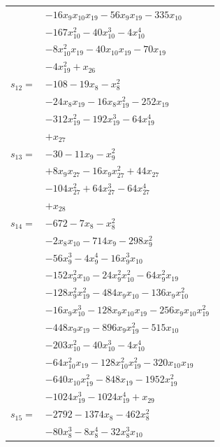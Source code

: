 \begin{longtable}{@{}r@{\;}l@{}}
 & \(\displaystyle -16x_{9}x_{10}x_{19} -56x_{9}x_{19} -335x_{10}\) \\
 & \(\displaystyle -167x_{10}^{2} -40x_{10}^{3} -4x_{10}^{4}\) \\
 & \(\displaystyle -8x_{10}^{2}x_{19} -40x_{10}x_{19} -70x_{19}\) \\
 & \(\displaystyle -4x_{19}^{2} +x_{26}\) \\[3pt]
\(s_{12}=\) & \(\displaystyle -108 -19x_{8} -x_{8}^{2}\) \\
 & \(\displaystyle -24x_{8}x_{19} -16x_{8}x_{19}^{2} -252x_{19}\) \\
 & \(\displaystyle -312x_{19}^{2} -192x_{19}^{3} -64x_{19}^{4}\) \\
 & \(\displaystyle +x_{27}\) \\[3pt]
\(s_{13}=\) & \(\displaystyle -30 -11x_{9} -x_{9}^{2}\) \\
 & \(\displaystyle +8x_{9}x_{27} -16x_{9}x_{27}^{2} +44x_{27}\) \\
 & \(\displaystyle -104x_{27}^{2} +64x_{27}^{3} -64x_{27}^{4}\) \\
 & \(\displaystyle +x_{28}\) \\[3pt]
\(s_{14}=\) & \(\displaystyle -672 -7x_{8} -x_{8}^{2}\) \\
 & \(\displaystyle -2x_{8}x_{10} -714x_{9} -298x_{9}^{2}\) \\
 & \(\displaystyle -56x_{9}^{3} -4x_{9}^{4} -16x_{9}^{3}x_{10}\) \\
 & \(\displaystyle -152x_{9}^{2}x_{10} -24x_{9}^{2}x_{10}^{2} -64x_{9}^{2}x_{19}\) \\
 & \(\displaystyle -128x_{9}^{2}x_{19}^{2} -484x_{9}x_{10} -136x_{9}x_{10}^{2}\) \\
 & \(\displaystyle -16x_{9}x_{10}^{3} -128x_{9}x_{10}x_{19} -256x_{9}x_{10}x_{19}^{2}\) \\
 & \(\displaystyle -448x_{9}x_{19} -896x_{9}x_{19}^{2} -515x_{10}\) \\
 & \(\displaystyle -203x_{10}^{2} -40x_{10}^{3} -4x_{10}^{4}\) \\
 & \(\displaystyle -64x_{10}^{2}x_{19} -128x_{10}^{2}x_{19}^{2} -320x_{10}x_{19}\) \\
 & \(\displaystyle -640x_{10}x_{19}^{2} -848x_{19} -1952x_{19}^{2}\) \\
 & \(\displaystyle -1024x_{19}^{3} -1024x_{19}^{4} +x_{29}\) \\[3pt]
\(s_{15}=\) & \(\displaystyle -2792 -1374x_{8} -462x_{8}^{2}\) \\
 & \(\displaystyle -80x_{8}^{3} -8x_{8}^{4} -32x_{8}^{3}x_{10}\) \\

\end{longtable}
